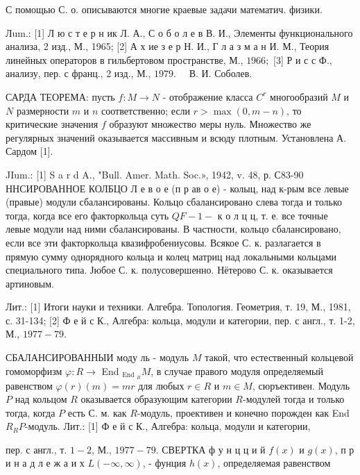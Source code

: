\documentclass[10pt]{article}
\begin{document}
С помощью С. о. описываются многие краевые задачи математич. физики.



Лum.: [1] Л ю с т е р н ик Л. А., С о б о л е в В. И., Элементы функционального анализа, 2 изд., М., 1965; [2] А х ие з е р Н. И., Г л а з м а н И. М., Теория линейных операторов в гильбертовом пространстве, М., $1966 ;$ [3] Р и с с Ф., анализу, пер. с франц., 2 изд., М., $1979 . \quad$ В. И. Соболев.



САРДА ТЕОРЕМА: пусть $f: M \rightarrow N$ - отображение класса $C^{r}$ многообразий $M$ и $N$ размерности $m$ и $n$ соответственно; если $r>\max (0, m-n)$, то критические значения $f$ образуют множество меры нуль. Множество же регулярных значений оказывается массивным и всюду плотным. Установлена А. Сардом [1].



JIum.: [1] S a r d A., "Bull. Amer. Math. Soc.», 1942, v. 48, р. С83-90 ННСИРОВАННОЕ КОЛБЦО Л е в о е (п р ав о е) - колыц, над к-рым все левые (правые) модули сбалансированы. Кольцо сбалансировано слева тогда и только тогда, когда все его факторкольца суть $Q F-1-$ к о л ц ц, т. е. все точные левые модули над ними сбалансированы. В частности, кольцо сбалансировано, если все эти факторкольца квазифробениусовы. Всякое С. к. разлагается в прямую сумму однорядного кольца и колец матриц над локальными кольцами специального типа. Јюбое С. к. полусовершенно. Нётерово С. к. оказывается артиновым.



Лит.: [1] Итоги науки и техники. Алгебра. Топология. Геометрия, т. 19, М., 1981, с. 31-134; [2] Ф е й с К., Алгебра: кольца, модули и категории, пер. с англ., т. 1-2, М., $1977-79$.



СБАЛАНСИРОВАННЫИ моду ль - модуль $M$ такой, что естественный кольцевой гомоморфизм $\varphi: R \rightarrow$ End $_{\text {End }_{R}} M$, в случае правого модуля определяемый равенством $\varphi(r)(m)=m r$ для любых $r \in R$ и $m \in M$, сюръективен. Модуль $P$ над кольцом $R$ оказывается образующим категории $R$-модулей тогда и только тогда, когда $P$ есть С. м. как $R$-модуль, проективен и конечно порожден как End $R_{R} P$-модуль. Лит.: [1] Ф е й с К., Алгебра: кольца, модули и категории,

пер. с англ., т. $1-2$, М., $1977-79$. СВЕРТКА ф у н ц ц и й $f(x)$ и $g(x)$, п р и н а д л е ж а и х $L(-\infty, \infty)$, - фунция $h(x)$, определяемая равенством
\end{document}
